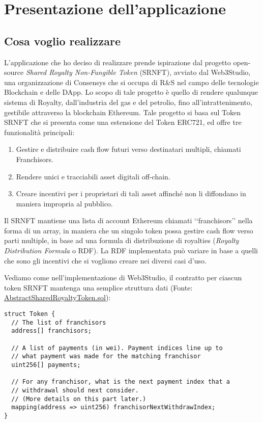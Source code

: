 \chapter{Presentazione dell'applicazione}

\section{Cosa voglio realizzare}
L'applicazione che ho deciso di realizzare prende ispirazione dal progetto open-source \textit{Shared Royalty Non-Fungible Token} (SRNFT), avviato dal Web3Studio, una organizzazione di Consensys che si occupa di R&S nel campo delle tecnologie Blockchain e delle DApp. Lo scopo di tale progetto è quello di rendere qualunque sistema di Royalty, dall'industria del gas e del petrolio, fino all'intrattenimento, gestibile attraverso la blockchain Ethereum. Tale progetto si basa sul Token SRNFT che si presenta come una estensione del Token ERC721, ed offre tre funzionalità principali:
\begin{enumerate}
    \item Gestire e distribuire cash flow futuri verso destinatari multipli, chiamati Franchisors.
    \item Rendere unici e tracciabili asset digitali off-chain.
    \item Creare incentivi per i proprietari di tali asset affinché non li diffondano in maniera impropria al pubblico.
\end{enumerate}
Il SRNFT mantiene una lista di account Ethereum chiamati ‘‘franchisors’’ nella forma di un array, in maniera che un singolo token possa gestire cash flow verso parti multiple, in base ad una formula di distribuzione di royalties (\textit{Royalty Distribution Formula} o RDF). La RDF implementata può variare in base a quelli che sono gli incentivi che si vogliono creare nei diversi casi d'uso.

Vediamo come nell'implementazione di Web3Studio, il contratto per ciascun token SRNFT mantenga una semplice struttura dati (Fonte: \href{https://github.com/ConsenSys/web3studio-bootleg/blob/master/packages/bootleg-tokens/contracts/AbstractSharedRoyaltyToken.sol#L13}{AbstractSharedRoyaltyToken.sol}):

\begin{lstlisting}[language=Solidity,numbers=none]
struct Token {
  // The list of franchisors
  address[] franchisors;

  // A list of payments (in wei). Payment indices line up to
  // what payment was made for the matching franchisor
  uint256[] payments;

  // For any franchisor, what is the next payment index that a
  // withdrawal should next consider.
  // (More details on this part later.)
  mapping(address => uint256) franchisorNextWithdrawIndex;
}
\end{lstlisting}

